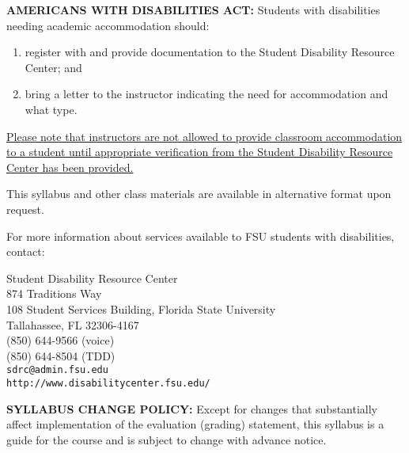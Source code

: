 \documentclass[12pt,oneside]{amsart}
\begin{document}
\noindent \textbf{AMERICANS WITH DISABILITIES ACT:}
Students with disabilities needing academic accommodation should:\vspace{-4.5mm}
\begin{enumerate}[label=(\arabic*)]
\item register with and provide documentation to the Student Disability Resource Center; and
\item bring a letter to the instructor indicating the need for accommodation and what type.
\end{enumerate}\vspace{-4.5mm}
\ul{Please note that instructors are not allowed to provide classroom accommodation to a student until appropriate verification from the Student Disability Resource Center has been provided.}

This syllabus and other class materials are available in alternative format upon request.


For more information about services available to FSU students with disabilities, contact:
\begin{center}
 Student Disability Resource Center
\\
874 Traditions Way
\\
108 Student Services Building, 
Florida State University
\\
Tallahassee, FL 32306-4167
\\
(850) 644-9566 (voice)
\\
(850) 644-8504 (TDD)
\\
\texttt{sdrc@admin.fsu.edu}
\\
\texttt{http://www.disabilitycenter.fsu.edu/}
\end{center}


\noindent \textbf{SYLLABUS CHANGE POLICY:}
Except for changes that substantially affect implementation of the evaluation (grading) statement, this syllabus is a guide for the course and is subject to change with advance notice.
\end{document}
